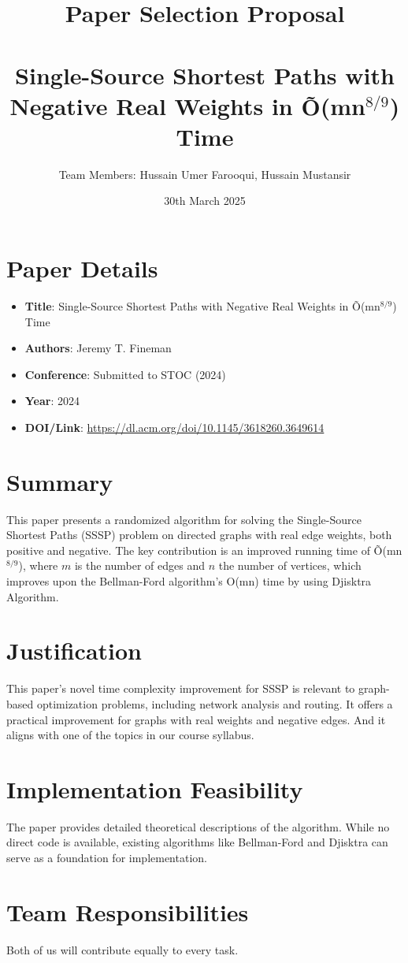 \documentclass[10pt]{article}
\title{Paper Selection Proposal \\ \\
Single-Source Shortest Paths with Negative Real Weights in Õ(mn$^{8/9}$) Time}
\author{Team Members: Hussain Umer Farooqui, Hussain Mustansir}
\date{30th March 2025}
\begin{document}
\maketitle

\section*{Paper Details}
\begin{itemize}

\item \textbf{Title}: Single-Source Shortest Paths with Negative Real Weights in Õ(mn$^{8/9}$) Time
\item \textbf{Authors}: Jeremy T. Fineman
\item \textbf{Conference}: Submitted to STOC (2024)
\item \textbf{Year}: 2024
\item \textbf{DOI/Link}: \url{https://dl.acm.org/doi/10.1145/3618260.3649614}
\end{itemize}
\section*{Summary}
This paper presents a randomized algorithm for solving the Single-Source Shortest Paths (SSSP) problem on directed graphs with real edge weights, both positive and negative. The key contribution is an improved running time of Õ(mn$^{8/9}$), where $m$ is the number of edges and $n$ the number of vertices, which improves upon the Bellman-Ford algorithm's O(mn) time by using Djisktra Algorithm.

\section*{Justification}
This paper's novel time complexity improvement for SSSP is relevant to graph-based optimization problems, including network analysis and routing. It offers a practical improvement for graphs with real weights and negative edges. And it aligns with one of the topics in our course syllabus.

\section*{Implementation Feasibility}
The paper provides detailed theoretical descriptions of the algorithm. While no direct code is available, existing algorithms like Bellman-Ford and Djisktra can serve as a foundation for implementation.

\section*{Team Responsibilities}
Both of us will contribute equally to every task.
\end{document}
